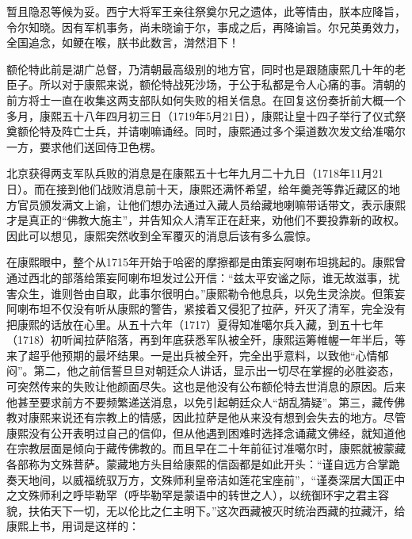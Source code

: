 
\begin{bookquote}暂且隐忍等候为妥。西宁大将军王亲往祭奠尔兄之遗体，此等情由，朕本应降旨，令尔知晓。因有军机事务，尚未晓谕于尔，事成之后，再降谕旨。尔兄英勇效力，全国追念，如鲠在喉，朕书此数言，潸然泪下！\end{bookquote}


额伦特此前是湖广总督，乃清朝最高级别的地方官，同时也是跟随康熙几十年的老臣子。所以对于康熙来说，额伦特战死沙场，于公于私都是令人心痛的事。清朝的前方将士一直在收集这两支部队如何失败的相关信息。在回复这份奏折前大概一个多月，康熙五十八年四月初三日（1719年5月21日），康熙让皇十四子举行了仪式祭奠额伦特及阵亡士兵，并请喇嘛诵经。同时，康熙通过多个渠道数次发文给准噶尔一方，要求他们送回侍卫色楞。



北京获得两支军队兵败的消息是在康熙五十七年九月二十九日（1718年11月21日）。而在接到他们战败消息前十天，康熙还满怀希望，给年羹尧等靠近藏区的地方官员颁发满文上谕，让他们想办法通过入藏人员给藏地喇嘛带话带文，表示康熙才是真正的“佛教大施主”，并告知众人清军正在赶来，劝他们不要投靠新的政权。因此可以想见，康熙突然收到全军覆灭的消息后该有多么震惊。



在康熙眼中，整个从1715年开始于哈密的摩擦都是由策妄阿喇布坦挑起的。康熙曾通过西北的部落给策妄阿喇布坦发过公开信：“兹太平安谧之际，谁无故滋事，扰害众生，谁则咎由自取，此事尔很明白。”康熙勒令他息兵，以免生灵涂炭。但策妄阿喇布坦不仅没有听从康熙的警告，紧接着又侵犯了拉萨，歼灭了清军，完全没有把康熙的话放在心里。从五十六年（1717）夏得知准噶尔兵入藏，到五十七年（1718）初听闻拉萨陷落，再到年底获悉军队被全歼，康熙运筹帷幄一年半后，等来了超乎他预期的最坏结果。一是出兵被全歼，完全出乎意料，以致他“心情郁闷”。第二，他之前信誓旦旦对朝廷众人讲话，显示出一切尽在掌握的必胜姿态，可突然传来的失败让他颜面尽失。这也是他没有公布额伦特去世消息的原因。后来他甚至要求前方不要频繁递送消息，以免引起朝廷众人“胡乱猜疑”。第三，藏传佛教对康熙来说还有宗教上的情感，因此拉萨是他从来没有想到会失去的地方。尽管康熙没有公开表明过自己的信仰，但从他遇到困难时选择念诵藏文佛经，就知道他在宗教层面是倾向于藏传佛教的。而且早在二十年前征讨准噶尔时，康熙就被蒙藏各部称为文殊菩萨。蒙藏地方头目给康熙的信函都是如此开头：“谨自远方合掌跪奏天地间，以威福统驭万方，文殊师利皇帝洁如莲花宝座前”，“谨奏深居大国正中之文殊师利之呼毕勒罕（呼毕勒罕是蒙语中的转世之人），以统御环宇之君主容貌，扶佑天下一切，无以伦比之仁主明下。”这次西藏被灭时统治西藏的拉藏汗，给康熙上书，用词是这样的：


